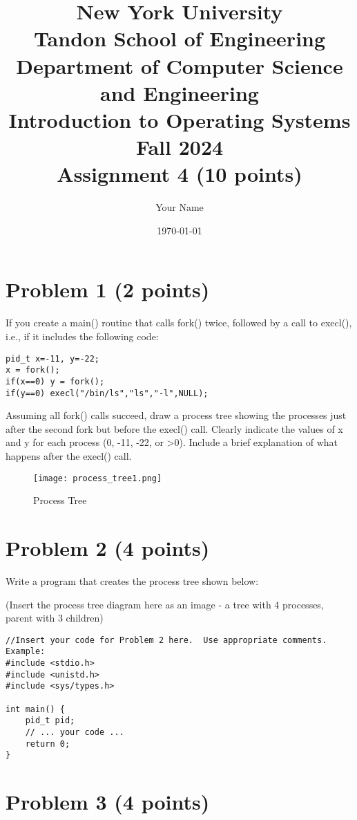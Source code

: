 \documentclass{article}
\title{New York University \\ Tandon School of Engineering \\ Department of Computer Science and Engineering \\ Introduction to Operating Systems \\ Fall 2024 \\ Assignment 4 (10 points)}
\author{Your Name}
\date{\today}
\begin{document}
\maketitle

\section*{Problem 1 (2 points)}

If you create a main() routine that calls fork() twice, followed by a call to execl(), i.e., if it includes the following code:

\begin{verbatim}
pid_t x=-11, y=-22;
x = fork();
if(x==0) y = fork();
if(y==0) execl("/bin/ls","ls","-l",NULL);
\end{verbatim}

Assuming all fork() calls succeed, draw a process tree showing the processes just after the second fork but before the execl() call. Clearly indicate the values of x and y for each process (0, -11, -22, or >0).  Include a brief explanation of what happens after the execl() call.


\begin{figure}[h]
\centering
\texttt{[image: process\_tree1.png]}
\caption{Process Tree}
\label{fig:process_tree1}
\end{figure}


\section*{Problem 2 (4 points)}

Write a program that creates the process tree shown below:

(Insert the process tree diagram here as an image - a tree with 4 processes, parent with 3 children)


\begin{verbatim}
//Insert your code for Problem 2 here.  Use appropriate comments.  Example:
#include <stdio.h>
#include <unistd.h>
#include <sys/types.h>

int main() {
    pid_t pid;
    // ... your code ...
    return 0;
}
\end{verbatim}


\section*{Problem 3 (4 points)}
\end{document}
